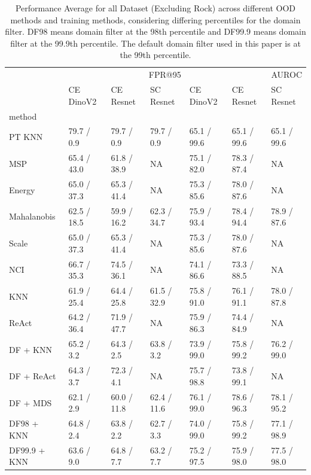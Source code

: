 \documentclass[letterpaper]{article} %
\theoremstyle{plain}
\theoremstyle{definition}
\theoremstyle{remark}
\begin{document}
\begin{table}

\caption{Performance Average for all Dataset (Excluding Rock) across different OOD methods and training methods, considering differing percentiles for the domain filter.  DF98 means domain filter at the 98th percentile and DF99.9 means domain filter at the 99.9th percentile. The default domain filter used in this paper is at the 99th percentile.  }
\label{tab:threshold2}
\begin{tabular}{lllllll}
\toprule
 & \multicolumn{3}{r}{FPR@95} & \multicolumn{3}{r}{AUROC} \\
 & CE DinoV2 & CE Resnet & SC Resnet & CE DinoV2 & CE Resnet & SC Resnet \\
method &  &  &  &  &  &  \\
\midrule
PT KNN & 79.7 / 0.9 & 79.7 / 0.9 & 79.7 / 0.9 & 65.1 / 99.6 & 65.1 / 99.6 & 65.1 / 99.6 \\
MSP & 65.4 / 43.0 & 61.8 / 38.9 & NA & 75.1 / 82.0 & 78.3 / 87.4 & NA \\
Energy & 65.0 / 37.3 & 65.3 / 41.4 & NA & 75.3 / 85.6 & 78.0 / 87.6 & NA \\
Mahalanobis & 62.5 / 18.5 & 59.9 / 16.2 & 62.3 / 34.7 & 75.9 / 93.4 & 78.4 / 94.4 & 78.9 / 87.6 \\
Scale & 65.0 / 37.3 & 65.3 / 41.4 & NA & 75.3 / 85.6 & 78.0 / 87.6 & NA \\
NCI & 66.7 / 35.3 & 74.5 / 36.1 & NA & 74.1 / 86.6 & 73.3 / 88.5 & NA \\
KNN & 61.9 / 25.4 & 64.4 / 25.8 & 61.5 / 32.9 & 75.8 / 91.0 & 76.1 / 91.1 & 78.0 / 87.8 \\
ReAct & 64.2 / 36.4 & 71.9 / 47.7 & NA & 75.9 / 86.3 & 74.4 / 84.9 & NA \\
DF + KNN & 65.2 / 3.2 & 64.3 / 2.5 & 63.8 / 3.2 & 73.9 / 99.0 & 75.8 / 99.2 & 76.2 / 99.0 \\
DF + ReAct & 64.3 / 3.7 & 72.3 / 4.1 & NA & 75.7 / 98.8 & 73.8 / 99.1 & NA \\
DF + MDS & 62.1 / 2.9 & 60.0 / 11.8 & 62.4 / 11.6 & 76.1 / 99.0 & 78.6 / 96.3 & 78.1 / 95.2 \\
DF98 + KNN & 64.8 / 2.4 & 63.8 / 2.2 & 62.7 / 3.3 & 74.0 / 99.0 & 75.8 / 99.2 & 77.1 / 98.9 \\
DF99.9 + KNN & 63.6 / 9.0 & 64.8 / 7.7 & 63.2 / 7.7 & 75.2 / 97.5 & 75.9 / 98.0 & 77.5 / 98.0 \\
\bottomrule
\end{tabular}
    
\end{table}
\end{document}
